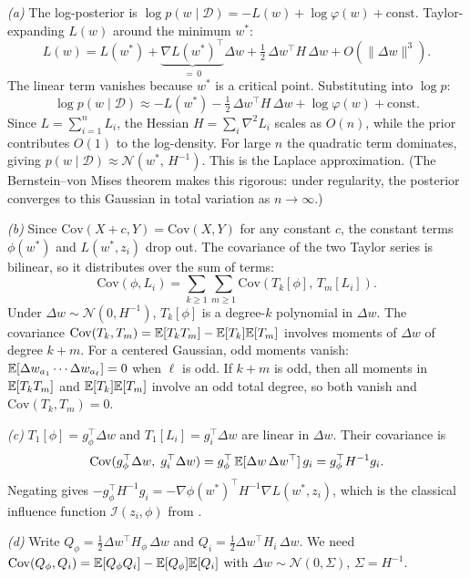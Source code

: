 \begin{solution}

\textit{(a)} The log-posterior is $\log p(w\mid\mathcal{D}) = -L(w) + \log\varphi(w) + \mathrm{const}$. Taylor-expanding $L(w)$ around the minimum $w^*$:
\[
  L(w) = L(w^*) + \underbrace{\nabla L(w^*)^\top}_{=\,0}\Delta w + \tfrac{1}{2}\,\Delta w^\top H\,\Delta w + O(\|\Delta w\|^3).
\]
The linear term vanishes because $w^*$ is a critical point. Substituting into $\log p$:
\[
  \log p(w\mid\mathcal{D}) \approx -L(w^*) - \tfrac{1}{2}\,\Delta w^\top H\,\Delta w + \log\varphi(w) + \mathrm{const}.
\]
Since $L = \sum_{i=1}^n L_i$, the Hessian $H = \sum_i \nabla^2 L_i$ scales as $O(n)$, while the prior contributes $O(1)$ to the log-density. For large $n$ the quadratic term dominates, giving $p(w\mid\mathcal{D}) \approx \mathcal{N}(w^*,\,H^{-1})$. This is the Laplace approximation. (The Bernstein--von Mises theorem makes this rigorous: under regularity, the posterior converges to this Gaussian in total variation as $n\to\infty$.)

\textit{(b)} Since $\mathrm{Cov}(X+c,Y) = \mathrm{Cov}(X,Y)$ for any constant $c$, the constant terms $\phi(w^*)$ and $L(w^*,z_i)$ drop out. The covariance of the two Taylor series is bilinear, so it distributes over the sum of terms:
\[
  \mathrm{Cov}(\phi,L_i) = \sum_{k\ge 1}\sum_{m\ge 1}\mathrm{Cov}(T_k[\phi],\,T_m[L_i]).
\]
Under $\Delta w\sim\mathcal{N}(0,H^{-1})$, $T_k[\phi]$ is a degree-$k$ polynomial in $\Delta w$. The covariance $\mathrm{Cov}(T_k,T_m) = \mathbb{E}[T_k T_m] - \mathbb{E}[T_k]\mathbb{E}[T_m]$ involves moments of $\Delta w$ of degree $k+m$. For a centered Gaussian, odd moments vanish: $\mathbb{E}[\Delta w_{a_1}\cdots\Delta w_{a_\ell}] = 0$ when $\ell$ is odd. If $k+m$ is odd, then all moments in $\mathbb{E}[T_k T_m]$ and $\mathbb{E}[T_k]\mathbb{E}[T_m]$ involve an odd total degree, so both vanish and $\mathrm{Cov}(T_k,T_m)=0$.

\textit{(c)} $T_1[\phi] = g_\phi^\top\Delta w$ and $T_1[L_i] = g_i^\top\Delta w$ are linear in $\Delta w$. Their covariance is
\[
  \mathrm{Cov}(g_\phi^\top\Delta w,\;g_i^\top\Delta w) = g_\phi^\top\,\mathbb{E}[\Delta w\,\Delta w^\top]\,g_i = g_\phi^\top H^{-1}g_i.
\]
Negating gives $-g_\phi^\top H^{-1}g_i = -\nabla\phi(w^*)^\top H^{-1}\nabla L(w^*,z_i)$, which is the classical influence function $\mathcal{I}(z_i,\phi)$ from .

\textit{(d)} Write $Q_\phi = \tfrac12\Delta w^\top H_\phi\,\Delta w$ and $Q_i = \tfrac12\Delta w^\top H_i\,\Delta w$. We need $\mathrm{Cov}(Q_\phi,Q_i) = \mathbb{E}[Q_\phi Q_i] - \mathbb{E}[Q_\phi]\mathbb{E}[Q_i]$ with $\Delta w\sim\mathcal{N}(0,\Sigma)$, $\Sigma=H^{-1}$.


\end{solution}
